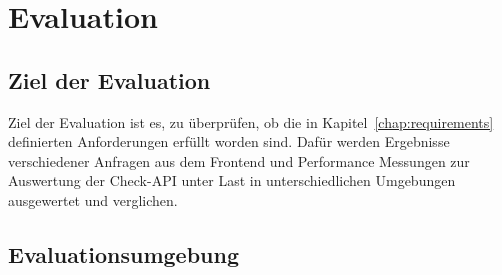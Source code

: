 \chapter{Evaluation}
\label{chap:evaluation}

\section{Ziel der Evaluation}
Ziel der Evaluation ist es, zu überprüfen, ob die in Kapitel~\ref{chap:requirements} definierten Anforderungen erfüllt worden sind. Dafür werden Ergebnisse verschiedener Anfragen aus dem Frontend und Performance Messungen zur Auswertung der Check-API unter Last in unterschiedlichen Umgebungen ausgewertet und verglichen.

\section{Evaluationsumgebung}
